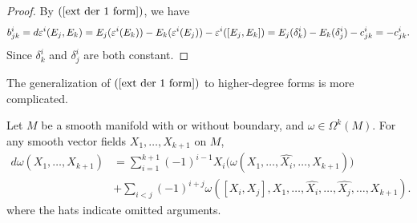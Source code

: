 \begin{proof}
By $(\ref{ext der 1 form})$, we have
\[b^i_{jk}=d\varepsilon^i(E_j,E_k)=E_j(\varepsilon^i(E_k))-E_k(\varepsilon^i(E_j))-\varepsilon^i([E_j,E_k])=E_j(\delta^i_k)-E_k(\delta^i_j)-c^i_{jk}=-c^i_{jk}.\]
Since $\delta^i_k$ and $\delta^i_j$ are both constant.
\end{proof}
The generalization of $(\ref{ext der 1 form})$ to higher-degree forms is more complicated.
\begin{proposition}
Let $M$ be a smooth manifold with or without boundary, and $\omega\in\Omega^k(M)$. For any smooth vector fields $X_1,\dots,X_{k+1}$ on $M$,
\begin{align*}
d\omega(X_1,\dots,X_{k+1})&=\sum_{i=1}^{k+1}(-1)^{i-1}X_i\big(\omega(X_1,\dots,\widehat{X_i},\dots,X_{k+1})\big)\\
&+\sum_{i<j}(-1)^{i+j}\omega([X_i,X_j],X_1,\dots,\widehat{X_i},\dots,\widehat{X_j},\dots,X_{k+1}).
\end{align*}
where the hats indicate omitted arguments.
\end{proposition}
